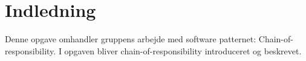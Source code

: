 \chapter{Indledning}\label{ch:introduction}
Denne opgave omhandler gruppens arbejde med software patternet: Chain-of-responsibility. I opgaven bliver chain-of-responsibility introduceret og beskrevet. 